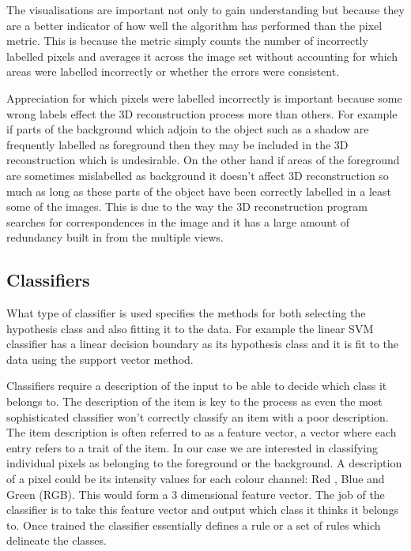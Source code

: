 \documentclass[12pt]{IIBproject}
\begin{document}
The visualisations are important not only to gain understanding but because they are a better indicator of how well the algorithm has performed than the pixel metric. This is because the metric simply counts the number of incorrectly labelled pixels and averages it across the image set without accounting for which areas were labelled incorrectly or whether the errors were consistent. 

Appreciation for which pixels were labelled incorrectly is important because some wrong labels effect the 3D reconstruction process more than others. For example if parts of the background which adjoin to the object such as a shadow are frequently labelled as foreground then they may be included in the 3D reconstruction which is undesirable. On the other hand if areas of the foreground are sometimes mislabelled as background it doesn't affect 3D reconstruction so much as long as these parts of the object have been correctly labelled in a least some of the images. This is due to the way the 3D reconstruction program searches for correspondences in the image and it has a large amount of redundancy built in from the multiple views.

\subsection{Classifiers}
What type of classifier is used specifies the methods for both selecting the hypothesis class and also fitting it to the data. For example the linear SVM classifier has a linear decision boundary as its hypothesis class and it is fit to the data using the support vector method.

Classifiers require a description of the input to be able to decide which class it belongs to. The description of the item is key to the process as even the most sophisticated classifier won't correctly classify an item with a poor description. The item description is often referred to as a feature vector, a vector where each entry refers to a trait of the item. In our case we are interested in classifying individual pixels as belonging to the foreground or the background. A description of a pixel could be its intensity values for each colour channel: Red , Blue and Green (RGB). This would form a 3 dimensional feature vector. The job of the classifier is to take this feature vector and output which class it thinks it belongs to. Once trained the classifier essentially defines a rule or a set of rules which delineate the classes.
\end{document}
